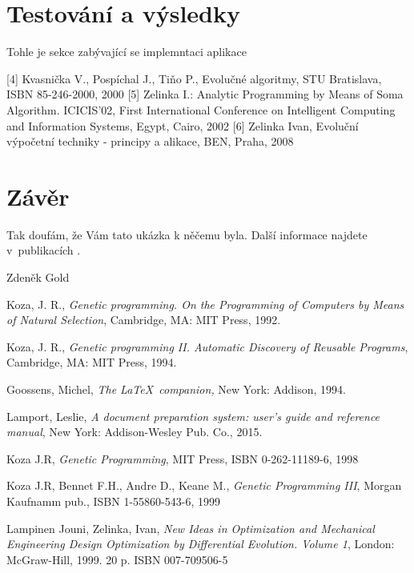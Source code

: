 \documentclass[bc,male,java,dept460]{diploma}		%
\begin{document}
\section{Testování a výsledky}
Tohle je sekce zabývající se implemntaci aplikace

[4] Kvasnička V., Pospíchal J., Tiňo P., Evolučné algoritmy, STU Bratislava, ISBN 85-246-2000, 2000
[5] Zelinka I.: Analytic Programming by Means of Soma Algorithm. ICICIS’02, First International Conference on Intelligent Computing and Information Systems, Egypt, Cairo, 2002
[6] Zelinka Ivan, Evoluční výpočetní techniky - principy a alikace, BEN, Praha, 2008 

\section{Závěr}
\label{sec:Conclusion}
Tak doufám, že Vám tato ukázka k něčemu byla. Další informace najdete v~publikacích
\cite{goossens94,lamport94}.

\bigskip
\begin{flushright}
Zdeněk Gold
\end{flushright}

\begin{thebibliography}{99}

 Koza, J. R.,
\textit{Genetic programming. On the Programming of Computers by Means of Natural Selection},
Cambridge, MA: MIT Press, 1992.

 Koza, J. R.,
\textit{Genetic programming II. Automatic Discovery of Reusable Programs},
Cambridge, MA: MIT Press, 1994.

 Goossens, Michel,
\textit{The \LaTeX\ companion,} New York: Addison, 1994.

 Lamport, Leslie,
\textit{A document preparation system: user's guide and reference manual},
New York: Addison-Wesley Pub. Co., 2015.

 Koza J.R, 
\textit{Genetic Programming},
MIT Press, ISBN 0-262-11189-6, 1998

 Koza J.R, Bennet F.H., Andre D., Keane M.,
\textit{Genetic Programming III},
Morgan Kaufnamm pub., ISBN 1-55860-543-6, 1999

 Lampinen Jouni, Zelinka, Ivan,
\textit{New Ideas in Optimization and Mechanical Engineering Design Optimization by Differential Evolution. Volume 1},
London: McGraw-Hill, 1999. 20 p. ISBN 007-709506-5

\end{thebibliography}
\end{document}
